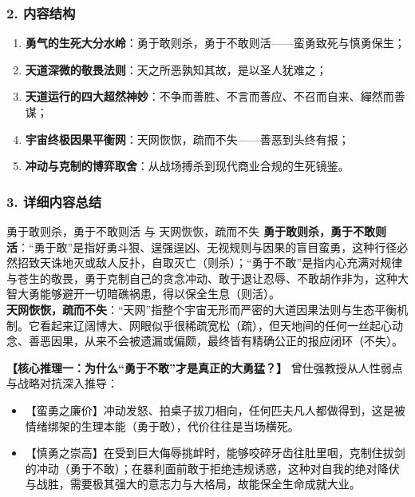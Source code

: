 \subsubsection{2. 内容结构}
\begin{enumerate}
    \item \textbf{勇气的生死大分水岭}：勇于敢则杀，勇于不敢则活——蛮勇致死与慎勇保生；
    \item \textbf{天道深微的敬畏法则}：天之所恶孰知其故，是以圣人犹难之；
    \item \textbf{天道运行的四大超然神妙}：不争而善胜、不言而善应、不召而自来、繟然而善谋；
    \item \textbf{宇宙终极因果平衡网}：天网恢恢，疏而不失——善恶到头终有报；
    \item \textbf{冲动与克制的博弈取舍}：从战场搏杀到现代商业合规的生死镜鉴。
\end{enumerate}

\subsubsection{3. 详细内容总结}

\begin{ConceptBox}{勇于敢则杀，勇于不敢则活 与 天网恢恢，疏而不失}
\textbf{勇于敢则杀，勇于不敢则活}：“勇于敢”是指好勇斗狠、逞强逞凶、无视规则与因果的盲目蛮勇，这种行径必然招致天诛地灭或敌人反扑，自取灭亡（则杀）；“勇于不敢”是指内心充满对规律与苍生的敬畏，勇于克制自己的贪念冲动、敢于退让忍辱、不敢胡作非为，这种大智大勇能够避开一切暗礁祸患，得以保全生息（则活）。\\
\textbf{天网恢恢，疏而不失}：“天网”指整个宇宙无形而严密的大道因果法则与生态平衡机制。它看起来辽阔博大、网眼似乎很稀疏宽松（疏），但天地间的任何一丝起心动念、善恶因果，从来不会被遗漏或偏颇，最终皆有精确公正的报应闭环（不失）。
\end{ConceptBox}

\noindent\textbf{【核心推理一：为什么“勇于不敢”才是真正的大勇猛？】}
曾仕强教授从人性弱点与战略对抗深入推导：
\begin{itemize}
    \item 【蛮勇之廉价】冲动发怒、拍桌子拔刀相向，任何匹夫凡人都做得到，这是被情绪绑架的生理本能（勇于敢），代价往往是当场横死。
    \item 【慎勇之崇高】在受到巨大侮辱挑衅时，能够咬碎牙齿往肚里咽，克制住拔剑的冲动（勇于不敢）；在暴利面前敢于拒绝违规诱惑，这种对自我的绝对降伏与战胜，需要极其强大的意志力与大格局，故能保全生命成就大业。
\end{itemize}

